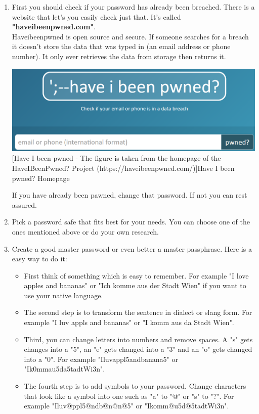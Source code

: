 \documentclass[conference]{IEEEtran}
\begin{document}
\begin{enumerate}
\item First you should check if your password has already been breached. There is a website that let's you easily check just that. It's called \textbf{"haveibeenpwned.com"}.\\
Haveibeenpwned is open source and secure. If someone searches for a breach it doesn't store the data that was typed in (an email address or phone number). It only ever retrieves the data from storage then returns it. \vspace{0.5cm}
\begin{center}
\includegraphics[scale=0.29]{./images/haveibeenpwned.png}
[Have I been pwned - The figure is taken from the homepage of the HaveIBeenPwned? Project (https://haveibeenpwned.com/)]{Have I been pwned? Homepage}
\end{center}
If you have already been pawned, change that password. If not you can rest assured. 
\item Pick a password safe that fits best for your needs. You can choose one of the ones mentioned above or do your own research.
\item Create a good master password or even better a master passphrase. Here is a easy way to do it: 
\begin{itemize}
\item First think of something which is easy to remember. For example "I love apples and bananas" or "Ich komme aus der Stadt Wien" if you want to use your native language.
\item The second step is to transform the sentence in dialect or slang form. For example "I luv appls and bananas" or "I komm aus da Stadt Wien".
\item Third, you can change letters into numbers and remove spaces. A "s" gets changes into a "5", an "e" gets changed into a "3" and an "o" gets changed into a "0". For example "Iluvappl5andbanana5" or "Ik0mmau5da5tadtWi3n".
\item The fourth step is to add symbols to your password. Change characters that look like a symbol into one such as "a" to "@" or "s" to "?". For example "Iluv@ppl5@ndb@n@n@5" or "Ikomm@u5d@5tadtWi3n".

\end{itemize}
\end{enumerate}
\end{document}
